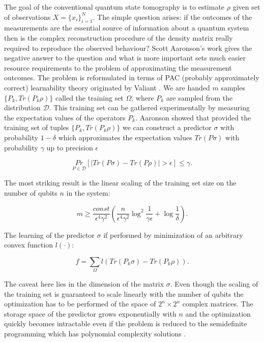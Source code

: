\documentclass[%
 reprint,
 amsmath,amssymb,
 aps,
]{revtex4-2}
\begin{document}
The goal of the conventional quantum state tomography is to estimate $\rho$ given set of observations $X =\{x_i\}_{i=1}^N$.
The simple question arises: if the outcomes of the measurements are the essential source of information about a quantum system then is the complex reconstruction procedure of the density matrix really required to reproduce the observed behaviour? Scott Aaronson's work \cite{Aaronson_2007} gives the negative answer to the question and what is more important sets much easier resource requirements to the problem of approximating the measurement outcomes. The problem is reformulated in terms of PAC (probably approximately correct) learnability theory originated by Valiant \cite{Valiant1984}. We are handed $m$ samples $\{P_{k}, Tr(P_{k}\rho)\}$ called the training set $\Omega$, where $P_{k}$ are sampled from the distribution $\mathcal{D}$. This training set can be gathered experimentally by measuring the expectation values of the operators $P_{k}$. Aaronson showed that provided the training set of tuples $\{P_{k}, Tr(P_{k}\rho)\}$  we can construct a predictor $\sigma$ with probability $1-\delta$ which approximates the expectation values $Tr(P\sigma)$ with probability $\gamma$ up to precision $\epsilon$

\begin{equation}\label{eq::pac_learned_state}
    \underset{P\in\mathcal{D}}{Pr}[|Tr(P\sigma)-Tr(P\rho)|>\epsilon]\leq \gamma.
\end{equation}

The most striking result is the linear scaling of the training set size on the number of qubits $n$ in the system:

\begin{equation}\label{eq::training_set_scaling}
    m \geq \frac{const}{\epsilon^{4}\gamma^{2}}(\frac{n}{\epsilon^{4}\gamma^{2}}\log^{2}{\frac{1}{\gamma\epsilon}} + \log{\frac{1}{\delta}}).
\end{equation}

The learning of the predictor $\sigma$ if performed by minimization of an arbitrary convex function $l(\cdot)$:

\begin{equation}\label{eq::learning_loss_function}
    f = \sum_{\Omega}l(Tr(P_{k}\sigma) - Tr(P_{k}\rho)).
\end{equation}

The caveat here lies in the dimension of the matrix $\sigma$. Even though the scaling of the training set is guaranteed to scale linearly with the number of qubits the optimization has to be performed of the space of $2^{n}\times 2^{n}$ complex matrices. The storage space of the predictor grows exponentially with $n$ and the optimization quickly becomes intractable even if the problem is reduced to the semidefinite programming which has polynomial complexity solutions \cite{Nesterov1994, Groetschel1988}.
\end{document}
